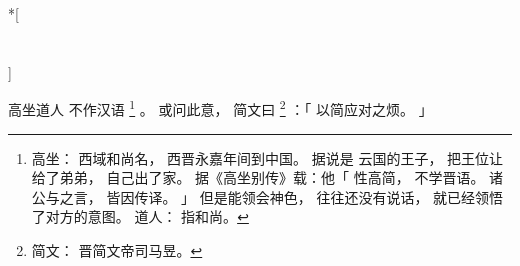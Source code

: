 
\switchcolumn[0]*[\section{}]

高坐道人
不作汉语%
\footnote{%
    高坐：
        西域和尚名，
        西晋永嘉年间到中国。
        据说是
        云国的王子，
        把王位让给了弟弟，
        自己出了家。
        据《高坐别传》载：他「
            性高简，
            不学晋语。
            诸公与之言，
            皆因传译。
        」
        但是能领会神色，
        往往还没有说话，
        就已经领悟了对方的意图。
    道人：
        指和尚。
}%
。
或问此意，
简文曰%
\footnote{%
    简文：
        晋简文帝司马昱。
}%
：「
    以简应对之烦。
」

\switchcolumn



